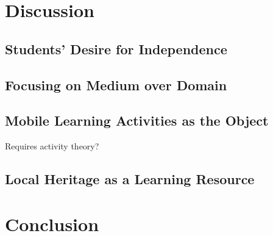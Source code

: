 \documentclass{sigchi}
\begin{document}
\section{Discussion}

\subsection{Students' Desire for Independence}

\subsection{Focusing on Medium over Domain}

\subsection{Mobile Learning Activities as the Object}
Requires activity theory?

\subsection{Local Heritage as a Learning Resource}

\section{Conclusion}


\end{document}

